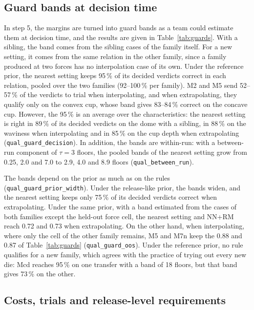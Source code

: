 \documentclass[pdflatex,sn-basic,lineno]{sn-jnl}
\newcommand{\res}[1]{\texttt{#1}}  %
\begin{document}
\subsection{Guard bands at decision time}\label{sec:res-procedure}

In step 5, the margins are turned into guard bands as a team could estimate them at decision time, and the results are given in Table~\ref{tab:guards}. With a sibling, the band comes from the sibling cases of the family itself. For a new setting, it comes from the same relation in the other family, since a family produced at two forces has no interpolation case of its own. Under the reference prior, the nearest setting keeps 95\,\% of its decided verdicts correct in each relation, pooled over the two families (92--100\,\% per family). M2 and M5 send 52--57\,\% of the verdicts to trial when interpolating, and when extrapolating, they qualify only on the convex cup, whose band gives 83--84\,\% correct on the concave cup. However, the 95\,\% is an average over the characteristics: the nearest setting is right in 89\,\% of its decided verdicts on the dome with a sibling, in 88\,\% on the waviness when interpolating and in 85\,\% on the cup depth when extrapolating (\res{qual\_guard\_decision}). In addition, the bands are within-run: with a between-run component of $\tau=3$ floors, the pooled bands of the nearest setting grow from 0.25, 2.0 and 7.0 to 2.9, 4.0 and 8.9 floors (\res{qual\_between\_run}).

The bands depend on the prior as much as on the rules (\res{qual\_guard\_prior\_width}). Under the release-like prior, the bands widen, and the nearest setting keeps only 75\,\% of its decided verdicts correct when extrapolating. Under the same prior, with a band estimated from the cases of both families except the held-out force cell, the nearest setting and NN+RM reach 0.72 and 0.73 when extrapolating. On the other hand, when interpolating, where only the cell of the other family remains, M5 and M7n keep the 0.88 and 0.87 of Table~\ref{tab:guards} (\res{qual\_guard\_oos}). Under the reference prior, no rule qualifies for a new family, which agrees with the practice of trying out every new die: Mcd reaches 95\,\% on one transfer with a band of 18 floors, but that band gives 73\,\% on the other.

\subsection{Costs, trials and release-level requirements}\label{sec:res-costs}
\end{document}

